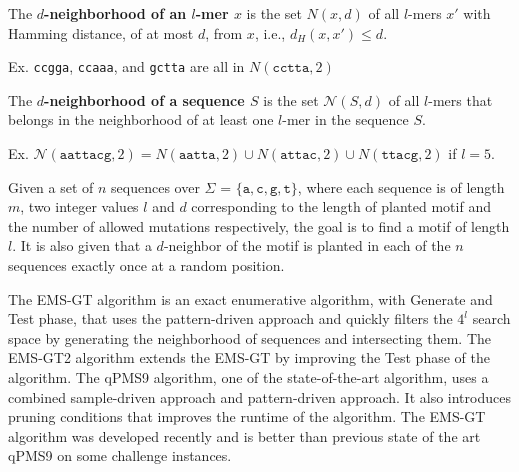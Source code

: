  \newline
\noindent The \textbf{\boldmath $d$-neighborhood of an $l$-mer $x$} is the set {\boldmath $N(x, d)$} of all $l$-mers $x'$ with Hamming distance, of at most $d$, from $x$, i.e., {\boldmath $d_H (x, x') \leq d$}.

\noindent \hspace*{35pt} Ex. \texttt{ccgga}, \texttt{ccaaa}, and \texttt{gctta} are all in $N(\texttt{cctta}, 2)$ \newline\newline

 \newline
\noindent The \textbf{\boldmath $d$-neighborhood of a sequence $S$} is the set {\boldmath $\mathcal{N}(S, d)$} of all $l$-mers that belongs in the neighborhood of at least one $l$-mer in the sequence $S$.

\noindent \hspace*{35pt} Ex. {\small $\mathcal{N}(\texttt{aattacg}, 2) = N(\texttt{aatta}, 2) \cup N(\texttt{attac}, 2) \cup N(\texttt{ttacg}, 2)$} \newline
\noindent \hspace*{55pt} if $l = 5$. \newline

 \newline
\noindent Given a set of $n$ sequences over $\Sigma$ = $\{\texttt{a}, \texttt{c}, \texttt{g}, \texttt{t}\}$, where each sequence is of length $m$, two integer values $l$ and $d$ corresponding to the length of planted motif and the number of allowed mutations respectively, the goal is to find a motif of length $l$. It is also given that a $d$-neighbor of the motif is planted in each of the $n$ sequences exactly once at a random position. \newline

 \newline
\noindent The EMS-GT algorithm is an exact enumerative algorithm, with Generate and Test phase, that uses the pattern-driven approach and quickly filters the $4^l$ search space by generating the neighborhood of sequences and intersecting them. The EMS-GT2 algorithm extends the EMS-GT by improving the Test phase of the algorithm. The qPMS9 algorithm, one of the state-of-the-art algorithm, uses a combined sample-driven approach and pattern-driven approach. It also introduces pruning conditions that improves the runtime of the algorithm. The EMS-GT algorithm was developed recently and is better than previous state of the art qPMS9 on some challenge instances.



